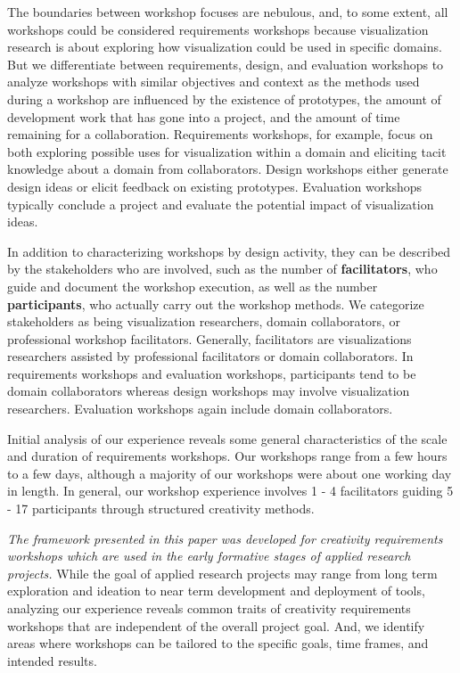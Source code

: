 The boundaries between workshop focuses are nebulous, and, to some extent, all workshops could be considered requirements workshops because visualization research is about exploring how visualization could be used in specific domains. But we differentiate between requirements, design, and evaluation workshops to analyze workshops with similar objectives and context as the methods used during a workshop are influenced by the existence of prototypes, the amount of development work that has gone into a project, and the amount of time remaining for a collaboration. Requirements workshops, for example, focus on both exploring possible uses for visualization within a domain and eliciting tacit knowledge about a domain from collaborators. Design workshops either generate design ideas or elicit feedback on existing prototypes. Evaluation workshops typically conclude a project and evaluate the potential impact of visualization ideas.

In addition to characterizing workshops by design activity, they can be described by the stakeholders who are involved, such as the number of {\bf facilitators}, who guide and document the workshop execution, as well as the number {\bf participants}, who actually carry out the workshop methods. We categorize stakeholders as being visualization researchers, domain collaborators, or professional workshop facilitators. Generally, facilitators are visualizations researchers assisted by professional facilitators or domain collaborators. In requirements workshops and evaluation workshops, participants tend to be domain collaborators whereas design workshops may involve visualization researchers. Evaluation workshops again include domain collaborators. 

Initial analysis of our experience reveals some general characteristics of the scale and duration of requirements workshops. Our workshops range from a few hours to a few days, although a majority of our workshops were about one working day in length. In general, our workshop experience involves 1 - 4 facilitators guiding 5 - 17 participants through structured creativity methods. 

{\it The framework presented in this paper was developed for creativity requirements workshops which are used in the early formative stages of applied research projects.} While the goal of applied research projects may range from long term exploration and ideation to near term development and deployment of tools, analyzing our experience reveals common traits of creativity requirements workshops that are independent of the overall project goal. And, we identify areas where workshops can be tailored to the specific goals, time frames, and intended results. %


